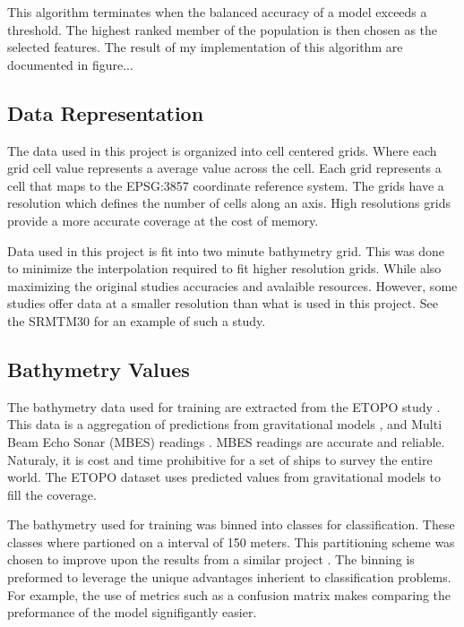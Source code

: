 \par
This algorithm terminates when the balanced accuracy of a model exceeds a threshold.
The highest ranked member of the population is then chosen as the selected features.
The result of my implementation of this algorithm are documented in figure...

\subsection{Data Representation}
The data used in this project is organized into cell centered grids.
Where each grid cell value represents a average value across the cell.
Each grid represents a cell that maps to the EPSG:3857 coordinate reference system.
The grids have a resolution which defines the number of cells along an axis.
High resolutions grids provide a more accurate coverage at the cost of memory.

\par
Data used in this project is fit into two minute bathymetry grid. 
This was done to minimize the interpolation required to fit higher resolution grids.
While also maximizing the original studies accuracies and avalaible resources.
However, some studies offer data at a smaller resolution than what is used in this project.
See the SRMTM30 \cite{becker2009global} for an example of such a study.

\subsection{Bathymetry Values}
The bathymetry data used for training are extracted from the ETOPO study \cite{national1988etopo}.
This data is a aggregation of predictions from gravitational models \cite{smith1997global} \cite{smith1994bathymetric}, and Multi Beam Echo Sonar (MBES) readings \cite{farr1980multibeam}.
MBES readings are accurate and reliable. 
Naturaly, it is cost and time prohibitive for a set of ships to survey the entire world.
The ETOPO dataset uses predicted values from gravitational models to fill the coverage.

\par
The bathymetry used for training was binned into classes for classification.
These classes where partioned on a interval of 150 meters.
This partitioning scheme was chosen to improve upon the results from a similar project \cite{national1988etopo}.
The binning is preformed to leverage the unique advantages inherient to classification problems.
For example, the use of metrics such as a confusion matrix makes comparing the preformance of the model signifigantly easier.




